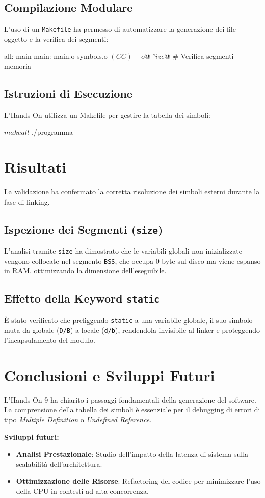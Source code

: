 \documentclass[a4paper,12pt]{article}
\begin{document}
\subsection{Compilazione Modulare}
L'uso di un \texttt{Makefile} ha permesso di automatizzare la generazione dei file oggetto e la verifica dei segmenti:
\begin{ccode}
all: main
main: main.o symbols.o
    $(CC) -o $@ $^
    size $@ # Verifica segmenti memoria
\end{ccode}


\subsection{Istruzioni di Esecuzione}
L'Hands-On utilizza un Makefile per gestire la tabella dei simboli:
\begin{terminal}[Makefile]
$ make all
$ ./programma
\end{terminal}

\section{Risultati}
La validazione ha confermato la corretta risoluzione dei simboli esterni durante la fase di linking.

\subsection{Ispezione dei Segmenti (\texttt{size})}
L'analisi tramite \texttt{size} ha dimostrato che le variabili globali non inizializzate vengono collocate nel segmento \texttt{BSS}, che occupa $0$ byte sul disco ma viene espanso in RAM, ottimizzando la dimensione dell'eseguibile.

\subsection{Effetto della Keyword \texttt{static}}
È stato verificato che prefiggendo \texttt{static} a una variabile globale, il suo simbolo muta da globale (\texttt{D/B}) a locale (\texttt{d/b}), rendendola invisibile al linker e proteggendo l'incapsulamento del modulo.

\section{Conclusioni e Sviluppi Futuri}
L'Hands-On 9 ha chiarito i passaggi fondamentali della generazione del software. La comprensione della tabella dei simboli è essenziale per il debugging di errori di tipo \textit{Multiple Definition} o \textit{Undefined Reference}.

\noindent \textbf{Sviluppi futuri:}
\begin{itemize}
    \item \textbf{Analisi Prestazionale}: Studio dell'impatto della latenza di sistema sulla scalabilità dell'architettura.
    \item \textbf{Ottimizzazione delle Risorse}: Refactoring del codice per minimizzare l'uso della CPU in contesti ad alta concorrenza.
\end{itemize}
\end{document}
